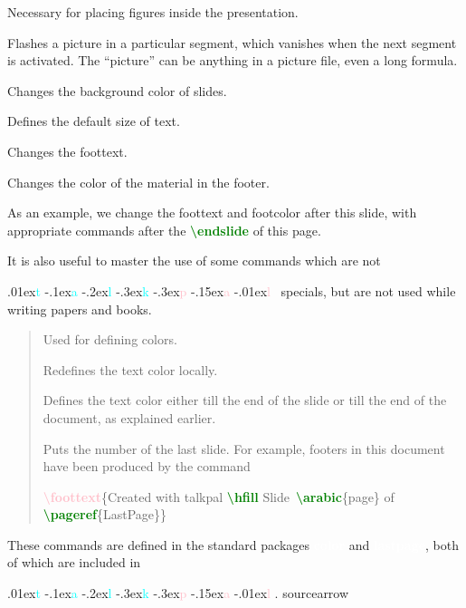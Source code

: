 \documentclass[12pt]{article}
\def\talkpal{
\raise.01ex\hbox{\textcolor{cyan}{t}}%
\raise-.1ex\hbox{\textcolor{cyan}{a}}%
\raise-.2ex\hbox{\textcolor{cyan}{l}}%
\raise-.3ex\hbox{\textcolor{cyan}{k}}%
\raise-.3ex\hbox{\textcolor{pink}{p}}%
\raise-.15ex\hbox{\textcolor{pink}{a}}%
\raise-.01ex\hbox{\textcolor{pink}{l}}%
}
\def\commcolor{pink}
\def\ecomm#1{\textcolor{green}{\bf \textbackslash#1}}
\def\comm#1{\textcolor{\commcolor}{\bf \textbackslash#1}}
\def\file#1{\textcolor{white}{\bf #1}}
\newenvironment{Quote}{\vspace{-5mm}\begin{quote}}{\end{quote}\vspace{-5mm}}
\begin{document}
\endslide

\beginslide

%
\begin{list}{}{\itemsep=0pt}
\item[\comm{putfigure}] Necessary for placing figures inside the
  presentation. 

\item[\comm{flash}] Flashes a picture in a particular segment, which
  vanishes when the next segment is activated.  The ``picture'' can be
  anything in a picture file, even a long formula.
  
\item[\comm{setbasecolor}] Changes the background color of slides.

\item[\ecomm{def}\comm{defaultsize}] Defines the default size of text.

\item[\ecomm{def}\comm{foottext}] Changes the foottext.

\item[\ecomm{def}\comm{footcolor}] Changes the color of the material in
  the footer.

\end{list}
As an example, we change the foottext and footcolor after this
slide, with appropriate commands after the \ecomm{endslide} of this
page.

\endslide

\def\foottext{The talkpal manual: written by Palash B. Pal}
\def\footcolor{pink}

\beginslide


It is also useful to master the use of some commands which are not
\talkpal\ specials, but are not used while writing papers and books.
%
\begin{Quote}
\begin{list}{}{\topsep=-1mm}
\item[\ecomm{definecolor}] Used for defining colors.

\item[\ecomm{textcolor}] Redefines the text color locally.

\item[\ecomm{color}] Defines the text color either till the end of the
  slide or till the end of the document, as explained earlier.

\item[\ecomm{pageref}\{Lastpage\}]  Puts the number of the last slide.
  For example, footers in this document have been produced by the
  command
  
  \comm{foottext}\{Created with talkpal \ecomm{hfill} 
  Slide~\ecomm{arabic}\{page\} of \ecomm{pageref}\{LastPage\}\}

\end{list}
\end{Quote}

These commands are defined in the standard packages \file{color} and
\file{lastpage}, both of which are included in
\talkpal. {sourcearrow}

\endslide
\end{document}
